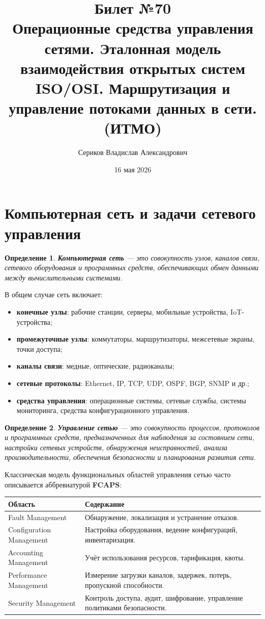 \documentclass[12pt,a4paper]{article}
\title{Билет №70 \\ \small Операционные средства управления сетями. Эталонная модель взаимодействия открытых систем ISO/OSI. Маршрутизация и управление потоками данных в сети. (ИТМО)}
\author{Сериков Владислав Александрович}
\date{16 мая 2026}
\newtheorem{definition}{Определение}
\begin{document}
\maketitle
\tableofcontents
\newpage

\section{Компьютерная сеть и задачи сетевого управления}

\begin{definition}
\textbf{Компьютерная сеть} --- это совокупность узлов, каналов связи, сетевого оборудования и программных средств, обеспечивающих обмен данными между вычислительными системами.
\end{definition}

В общем случае сеть включает:
\begin{itemize}
    \item \textbf{конечные узлы}: рабочие станции, серверы, мобильные устройства, IoT-устройства;
    \item \textbf{промежуточные узлы}: коммутаторы, маршрутизаторы, межсетевые экраны, точки доступа;
    \item \textbf{каналы связи}: медные, оптические, радиоканалы;
    \item \textbf{сетевые протоколы}: Ethernet, IP, TCP, UDP, OSPF, BGP, SNMP и др.;
    \item \textbf{средства управления}: операционные системы, сетевые службы, системы мониторинга, средства конфигурационного управления.
\end{itemize}

\begin{definition}
\textbf{Управление сетью} --- это совокупность процессов, протоколов и программных средств, предназначенных для наблюдения за состоянием сети, настройки сетевых устройств, обнаружения неисправностей, анализа производительности, обеспечения безопасности и планирования развития сети.
\end{definition}

Классическая модель функциональных областей управления сетью часто описывается аббревиатурой \textbf{FCAPS}:

\begin{center}
\begin{tabular}{|p{}|p{}|}
\hline
\textbf{Область} & \textbf{Содержание} \\
\hline
Fault Management & Обнаружение, локализация и устранение отказов. \\
\hline
Configuration Management & Настройка оборудования, ведение конфигураций, инвентаризация. \\
\hline
Accounting Management & Учёт использования ресурсов, тарификация, квоты. \\
\hline
Performance Management & Измерение загрузки каналов, задержек, потерь, пропускной способности. \\
\hline
Security Management & Контроль доступа, аудит, шифрование, управление политиками безопасности. \\
\hline
\end{tabular}
\end{center}
\end{document}
